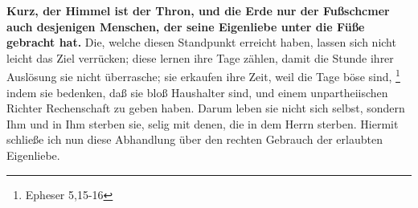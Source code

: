 \medskip

\textbf{Kurz, der Himmel ist der Thron, und die Erde nur der Fußschcmer auch desjenigen
Menschen, der seine Eigenliebe unter die Füße gebracht hat.} Die, welche diesen
Standpunkt erreicht haben, lassen sich nicht leicht das Ziel verrücken; diese
lernen ihre Tage zählen, damit die Stunde ihrer Auslösung sie nicht überrasche;
sie erkaufen ihre Zeit, weil die Tage böse sind,
\footnote{Epheser 5,15-16}
indem
sie bedenken, daß sie bloß Haushalter sind, und einem unpartheiischen Richter
Rechenschaft zu geben haben. Darum leben sie nicht sich selbst, sondern Ihm und
in Ihm sterben sie, selig mit denen, die in dem Herrn sterben. Hiermit schließe
ich nun diese Abhandlung über den rechten Gebrauch der erlaubten Eigenliebe.






